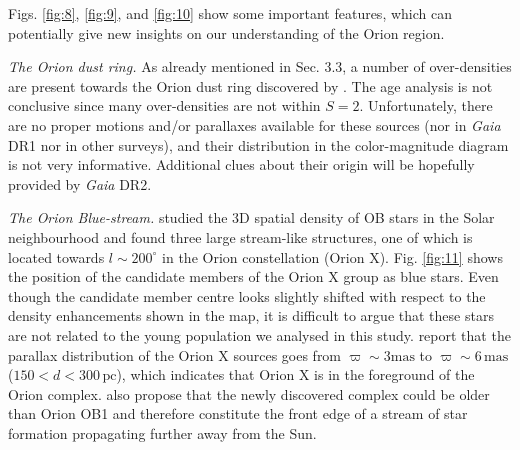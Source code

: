 \documentclass[onecolumn]{aa} %
\begin{document}
\noindent
Figs. \ref{fig:8}, \ref{fig:9}, and \ref{fig:10}  show some important features, which can potentially give new insights on our understanding of the Orion region.

\textit{The Orion dust ring.} As already mentioned in Sec. 3.3, a number of over-densities are present towards the Orion dust ring discovered by \cite{Schlafly2015}. The age analysis is not conclusive since many over-densities are not within $S = 2$. Unfortunately, there are no proper motions and/or parallaxes available for these sources (nor in \textit{Gaia} DR1 nor in other surveys), and their distribution in the color-magnitude diagram is not very informative. Additional clues about their origin will be hopefully provided by \textit{Gaia} DR2.

\textit{The Orion Blue-stream.} \cite{Bouy2015} studied the 3D spatial density of OB stars in the Solar neighbourhood and found three large stream-like structures, one of which is located towards $l \sim 200^{\circ}$ in the Orion constellation (Orion X). Fig. \ref{fig:11} shows the position of the candidate members of the Orion X group as blue stars. Even though the candidate member centre looks slightly shifted with respect to the density enhancements shown in the map, it is difficult to argue that these stars are not related to the young population we analysed in this study. \cite{Bouy2015} report that the parallax distribution of the Orion X sources goes from $\varpi \sim 3 \mathrm{mas}$ to $\varpi \sim 6 \, \mathrm{mas}$ ($150 < d < 300 \, \mathrm{pc}$), which indicates that Orion X is  in the foreground of the Orion complex. \cite{Bouy2015}  also propose that the newly discovered complex could be older than Orion OB1 and therefore constitute the front edge of a stream of star formation propagating further away from the Sun.
\end{document}
